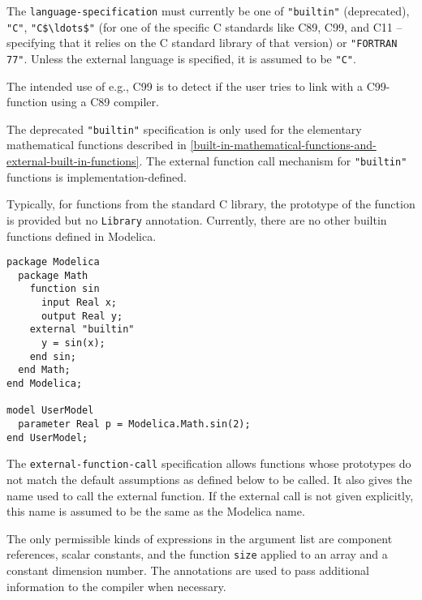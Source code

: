 The {\lstinline[language=grammar]!language-specification!} must currently be one of {\lstinline!"builtin"!} (deprecated), {\lstinline!"C"!}, {\lstinline!"C$\ldots$"!} (for one of the specific C standards like C89, C99, and C11 -- specifying
that it relies on the C standard library of that version) or {\lstinline!"FORTRAN 77"!}.
Unless the external language is specified, it is assumed to be {\lstinline!"C"!}.

\begin{nonnormative}
The intended use of e.g., C99 is to detect if the user tries to link with a C99-function using a C89 compiler.
\end{nonnormative}

The deprecated {\lstinline!"builtin"!} specification is only used for the elementary mathematical functions described in \cref{built-in-mathematical-functions-and-external-built-in-functions}.
The external function call mechanism for {\lstinline!"builtin"!} functions is implementation-defined.

\begin{nonnormative}
Typically, for functions from the standard C library, the prototype of the function is provided but no {\lstinline!Library!} annotation.  Currently, there are no other builtin functions defined in Modelica.
\end{nonnormative}

\begin{example}
\begin{lstlisting}[language=modelica]
package Modelica
  package Math
    function sin
      input Real x;
      output Real y;
    external "builtin"
      y = sin(x);
    end sin;
  end Math;
end Modelica;

model UserModel
  parameter Real p = Modelica.Math.sin(2);
end UserModel;
\end{lstlisting}
\end{example}

The {\lstinline[language=grammar]!external-function-call!} specification allows functions whose prototypes do not match the default assumptions as defined below to be called.  It also gives the name used to call the external function.  If the external call is not given explicitly, this name is assumed to be the same as the Modelica name.

The only permissible kinds of expressions in the argument list are component references, scalar constants, and the function {\lstinline!size!} applied to an array and a constant dimension number.
The annotations are used to pass additional information to the compiler when necessary.

